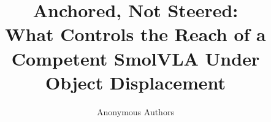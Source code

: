 \documentclass{article}
\title{Anchored, Not Steered:\\ What Controls the Reach of a Competent SmolVLA Under Object Displacement}
\author{Anonymous Authors}
\date{}
\begin{document}
\maketitle

\begin{abstract}

\end{abstract}













\appendix

\end{document}

